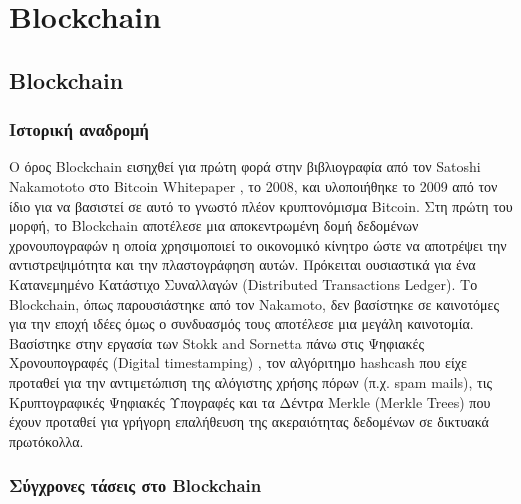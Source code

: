 \chapter{Blockchain}

\section{Blockchain}

\subsection{Ιστορική αναδρομή}

Ο όρος Blockchain εισηχθεί για πρώτη φορά στην βιβλιογραφία από τον Satoshi Nakamototo στο Bitcoin Whitepaper , το 2008, και υλοποιήθηκε το 2009 από τον ίδιο για να βασιστεί σε αυτό το γνωστό πλέον κρυπτονόμισμα Bitcoin. Στη πρώτη του μορφή, το Blockchain αποτέλεσε μια αποκεντρωμένη δομή δεδομένων χρονουπογραφών η οποία χρησιμοποιεί το οικονομικό κίνητρο ώστε να αποτρέψει την αντιστρεψιμότητα και την πλαστογράφηση αυτών. Πρόκειται ουσιαστικά για ένα Κατανεμημένο Κατάστιχο Συναλλαγών (Distributed Transactions Ledger). Το Blockchain, όπως παρουσιάστηκε από τον Nakamoto, δεν βασίστηκε σε καινοτόμες για την εποχή ιδέες όμως ο συνδυασμός τους αποτέλεσε μια μεγάλη καινοτομία. Βασίστηκε στην εργασία των Stokk and Sornetta πάνω στις Ψηφιακές Χρονουπογραφές (Digital timestamping) , τον αλγόριτημο hashcash  που είχε προταθεί για την αντιμετώπιση της αλόγιστης χρήσης πόρων (π.χ. spam mails), τις Κρυπτογραφικές Ψηφιακές Υπογραφές  και τα Δέντρα Merkle (Merkle Trees) που έχουν προταθεί για γρήγορη επαλήθευση της ακεραιότητας δεδομένων σε δικτυακά πρωτόκολλα.

\subsection{Σύγχρονες τάσεις στο Blockchain}

